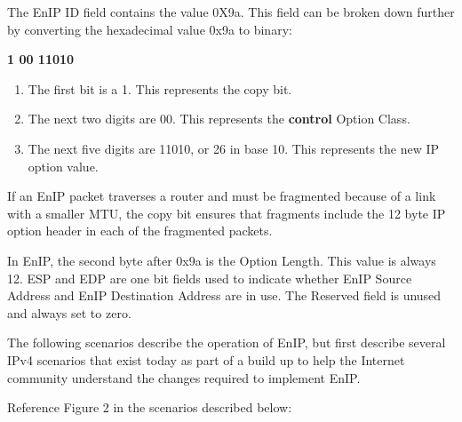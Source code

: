 The EnIP ID field contains the value 0X9a.   This field can be broken down further
by converting the hexadecimal value 0x9a to binary:

\begin{center}
\textbf{1 00 11010}
\end{center}

\begin{enumerate}
 \item The first bit is a 1.  This represents the copy bit.
 \item The next two digits are 00.  This represents the \textbf{control} Option Class.
 \item The next five digits are 11010, or 26 in base 10.  This represents the new IP option value.
\end{enumerate}


If an EnIP packet traverses a router and must be fragmented because 
of a link with a smaller MTU, the copy bit ensures that fragments
include the 12 byte IP option header in each of the fragmented
packets.

In EnIP, the second byte after 0x9a is the Option Length.  This value
is always 12.  ESP and EDP are one bit fields used to indicate
whether EnIP Source Address and EnIP Destination Address are in use.
The Reserved field is unused and always set to zero.



The following scenarios describe the operation of EnIP, but first describe several IPv4 scenarios 
that exist today as part of a build up to help the Internet community understand the 
changes required to implement EnIP. 

Reference Figure 2 in the scenarios described below:

